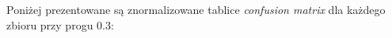 \documentclass[polish,12pt]{aghthesis}
\begin{document}
\par\noindent Poniżej prezentowane są znormalizowane tablice \textit{confusion matrix} dla każdego zbioru przy progu 0.3:

\begin{figure}[H]
    \begin{adjustbox}{minipage=1.0\paperwidth, pagecenter}
    \centering
    \qquad
    \end{adjustbox}
\end{figure}
\newpage
\end{document}
